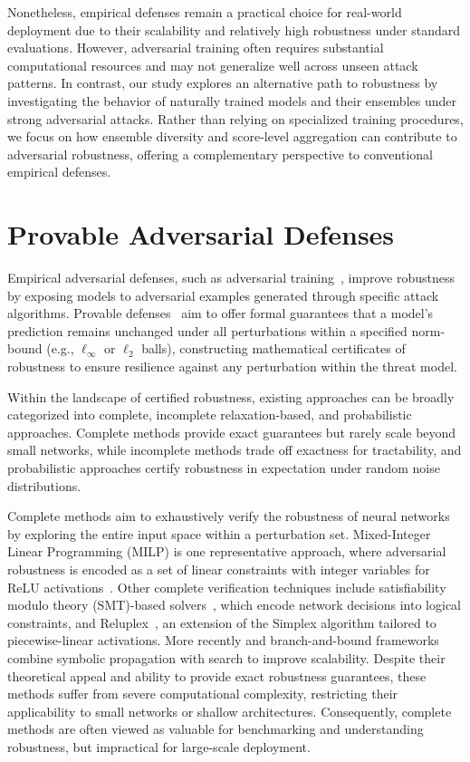 Nonetheless, empirical defenses remain a practical choice for real-world deployment due to their scalability and relatively high robustness under standard evaluations. However, adversarial training often requires substantial computational resources and may not generalize well across unseen attack patterns. In contrast, our study explores an alternative path to robustness by investigating the behavior of naturally trained models and their ensembles under strong adversarial attacks. Rather than relying on specialized training procedures, we focus on how ensemble diversity and score-level aggregation can contribute to adversarial robustness, offering a complementary perspective to conventional empirical defenses.


\section{Provable Adversarial Defenses}

\indent

Empirical adversarial defenses, such as adversarial training~\cite{madry2017towards}, improve robustness by exposing models to adversarial examples generated through specific attack algorithms. Provable defenses~\cite{wong2018provable, cohen2019certified} aim to offer formal guarantees that a model's prediction remains unchanged under all perturbations within a specified norm-bound (e.g., $\ell_\infty$ or $\ell_2$ balls), constructing mathematical certificates of robustness to ensure resilience against any perturbation within the threat model.

Within the landscape of certified robustness, existing approaches can be broadly categorized into complete, incomplete relaxation-based, and probabilistic approaches. Complete methods provide exact guarantees but rarely scale beyond small networks, while incomplete methods trade off exactness for tractability, and probabilistic approaches certify robustness in expectation under random noise distributions.


Complete methods aim to exhaustively verify the robustness of neural networks by exploring the entire input space within a perturbation set. Mixed-Integer Linear Programming (MILP) is one representative approach, where adversarial robustness is encoded as a set of linear constraints with integer variables for ReLU activations~\cite{tjeng2017evaluating}. Other complete verification techniques include satisfiability modulo theory (SMT)-based solvers~\cite{ehlers2017formal}, which encode network decisions into logical constraints, and Reluplex~\cite{katz2017reluplex}, an extension of the Simplex algorithm tailored to piecewise-linear activations. More recently and branch-and-bound frameworks~\cite{bunel2018unified} combine symbolic propagation with search to improve scalability. Despite their theoretical appeal and ability to provide exact robustness guarantees, these methods suffer from severe computational complexity, restricting their applicability to small networks or shallow architectures. Consequently, complete methods are often viewed as valuable for benchmarking and understanding robustness, but impractical for large-scale deployment.


